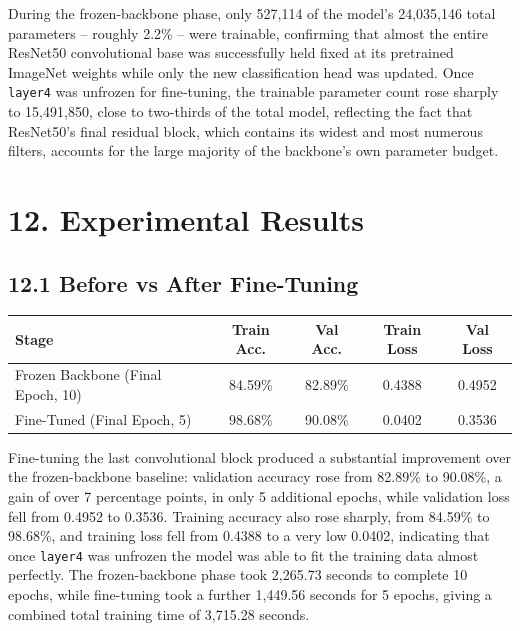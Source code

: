 \documentclass[11pt,a4paper]{article}
\begin{document}
\vspace{0.15cm}

During the frozen-backbone phase, only 527{,}114 of the model's 24{,}035{,}146 total parameters -- roughly 2.2\% -- were trainable, confirming that almost the entire ResNet50 convolutional base was successfully held fixed at its pretrained ImageNet weights while only the new classification head was updated. Once \texttt{layer4} was unfrozen for fine-tuning, the trainable parameter count rose sharply to 15{,}491{,}850, close to two-thirds of the total model, reflecting the fact that ResNet50's final residual block, which contains its widest and most numerous filters, accounts for the large majority of the backbone's own parameter budget.

\section*{12. Experimental Results}

\subsection*{12.1 Before vs After Fine-Tuning}

\begin{center}
\begin{tabular}{|p{6cm}|c|c|c|c|}
\hline
\textbf{Stage} & \textbf{Train Acc.} & \textbf{Val Acc.} & \textbf{Train Loss} & \textbf{Val Loss}\\
\hline
Frozen Backbone (Final Epoch, 10) & 84.59\% & 82.89\% & 0.4388 & 0.4952\\
\hline
Fine-Tuned (Final Epoch, 5) & 98.68\% & 90.08\% & 0.0402 & 0.3536\\
\hline
\end{tabular}
\end{center}

\vspace{0.15cm}

Fine-tuning the last convolutional block produced a substantial improvement over the frozen-backbone baseline: validation accuracy rose from 82.89\% to 90.08\%, a gain of over 7 percentage points, in only 5 additional epochs, while validation loss fell from 0.4952 to 0.3536. Training accuracy also rose sharply, from 84.59\% to 98.68\%, and training loss fell from 0.4388 to a very low 0.0402, indicating that once \texttt{layer4} was unfrozen the model was able to fit the training data almost perfectly. The frozen-backbone phase took 2{,}265.73 seconds to complete 10 epochs, while fine-tuning took a further 1{,}449.56 seconds for 5 epochs, giving a combined total training time of 3{,}715.28 seconds.
\end{document}
